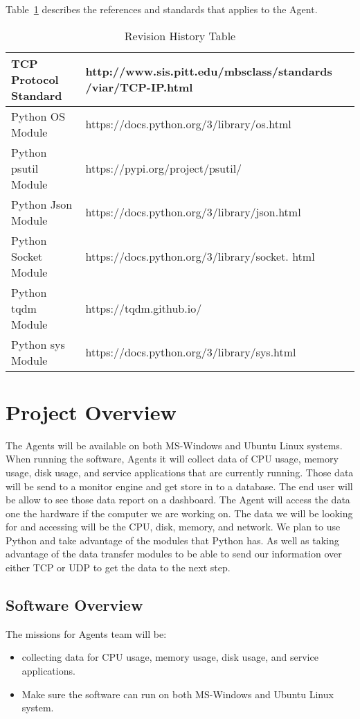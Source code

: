\documentclass[letterpaper,12pt,oneside,listof=totoc]{scrreprt}
\begin{document}
Table~\ref{Ref&Std} describes the references and standards that applies to the Agent.

\begin{table}[h!]
\centering
\begin{tabular}{|  p{} | p{} |} 

\hline
TCP Protocol Standard &       http://www.sis.pitt.edu/mbsclass/standards /viar/TCP-IP.html \\
\hline
Python OS Module & https://docs.python.org/3/library/os.html\\
\hline
Python psutil Module& https://pypi.org/project/psutil/\\
\hline
Python Json Module & https://docs.python.org/3/library/json.html\\
\hline
Python Socket Module& https://docs.python.org/3/library/socket. html\\
\hline
Python tqdm Module& https://tqdm.github.io/\\
\hline
Python sys Module& https://docs.python.org/3/library/sys.html\\
\hline



\end{tabular}
\caption{Revision History Table}
\label{Ref&Std}
\end{table}


\chapter{Project Overview}
\indent  \indent The Agents will be available on both MS-Windows and Ubuntu Linux systems. When running the software, Agents it will collect data of CPU usage, memory usage, disk usage, and service applications that are currently running. Those data will be send to a monitor engine and get store in to a database. The end user will be allow to see those data report on a dashboard. \newline \newline
\indent The Agent will access the data one the hardware if the computer we are working on. The data we will be looking for and accessing will be the CPU, disk, memory, and network. We plan to use Python and take advantage of the modules that Python has. As well as taking advantage of the data transfer modules to be able to send our information over either TCP or UDP to get the data to the next step.

\section{Software Overview}
The missions for Agents team will be: 
\begin{itemize}
\item  collecting data for CPU usage, memory usage, disk usage, and service applications. 
\item Make sure the software can run on both MS-Windows and Ubuntu Linux system.
\end{itemize}
\newpage
\end{document}
